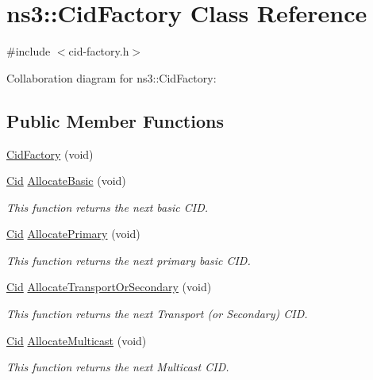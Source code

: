 \hypertarget{classns3_1_1CidFactory}{}\section{ns3\+:\+:Cid\+Factory Class Reference}
\label{classns3_1_1CidFactory}


{\ttfamily \#include $<$cid-\/factory.\+h$>$}



Collaboration diagram for ns3\+:\+:Cid\+Factory\+:
\subsection*{Public Member Functions}
\begin{DoxyCompactItemize}
\item 
\hyperlink{classns3_1_1CidFactory_a5814c04295a0c0b107a38a6039289882}{Cid\+Factory} (void)
\item 
\hyperlink{classns3_1_1Cid}{Cid} \hyperlink{classns3_1_1CidFactory_aac9c1964a20ab7218f0be613a3bea9a0}{Allocate\+Basic} (void)
\begin{DoxyCompactList}\small\item\em This function returns the next basic C\+ID. \end{DoxyCompactList}\item 
\hyperlink{classns3_1_1Cid}{Cid} \hyperlink{classns3_1_1CidFactory_a97a554509278a2aea02cc57ad42e633d}{Allocate\+Primary} (void)
\begin{DoxyCompactList}\small\item\em This function returns the next primary basic C\+ID. \end{DoxyCompactList}\item 
\hyperlink{classns3_1_1Cid}{Cid} \hyperlink{classns3_1_1CidFactory_a8d78cf5c65467740cde02b94f70c4bab}{Allocate\+Transport\+Or\+Secondary} (void)
\begin{DoxyCompactList}\small\item\em This function returns the next Transport (or Secondary) C\+ID. \end{DoxyCompactList}\item 
\hyperlink{classns3_1_1Cid}{Cid} \hyperlink{classns3_1_1CidFactory_aafc0b7e9d509b683c2fecfed8e799cdd}{Allocate\+Multicast} (void)
\begin{DoxyCompactList}\small\item\em This function returns the next Multicast C\+ID. \end{DoxyCompactList}\item 

\end{DoxyCompactItemize}
